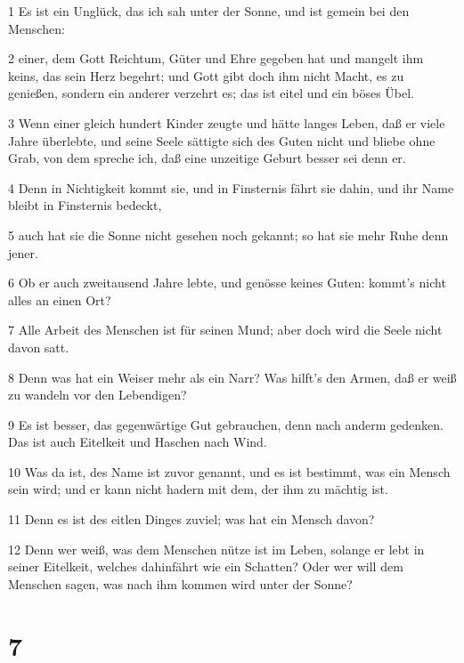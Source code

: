 \par 1 Es ist ein Unglück, das ich sah unter der Sonne, und ist gemein bei den Menschen:
\par 2 einer, dem Gott Reichtum, Güter und Ehre gegeben hat und mangelt ihm keins, das sein Herz begehrt; und Gott gibt doch ihm nicht Macht, es zu genießen, sondern ein anderer verzehrt es; das ist eitel und ein böses Übel.
\par 3 Wenn einer gleich hundert Kinder zeugte und hätte langes Leben, daß er viele Jahre überlebte, und seine Seele sättigte sich des Guten nicht und bliebe ohne Grab, von dem spreche ich, daß eine unzeitige Geburt besser sei denn er.
\par 4 Denn in Nichtigkeit kommt sie, und in Finsternis fährt sie dahin, und ihr Name bleibt in Finsternis bedeckt,
\par 5 auch hat sie die Sonne nicht gesehen noch gekannt; so hat sie mehr Ruhe denn jener.
\par 6 Ob er auch zweitausend Jahre lebte, und genösse keines Guten: kommt's nicht alles an einen Ort?
\par 7 Alle Arbeit des Menschen ist für seinen Mund; aber doch wird die Seele nicht davon satt.
\par 8 Denn was hat ein Weiser mehr als ein Narr? Was hilft's den Armen, daß er weiß zu wandeln vor den Lebendigen?
\par 9 Es ist besser, das gegenwärtige Gut gebrauchen, denn nach anderm gedenken. Das ist auch Eitelkeit und Haschen nach Wind.
\par 10 Was da ist, des Name ist zuvor genannt, und es ist bestimmt, was ein Mensch sein wird; und er kann nicht hadern mit dem, der ihm zu mächtig ist.
\par 11 Denn es ist des eitlen Dinges zuviel; was hat ein Mensch davon?
\par 12 Denn wer weiß, was dem Menschen nütze ist im Leben, solange er lebt in seiner Eitelkeit, welches dahinfährt wie ein Schatten? Oder wer will dem Menschen sagen, was nach ihm kommen wird unter der Sonne?

\chapter{7}

